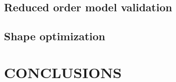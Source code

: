 \documentclass[a4paper]{eccomas_paper-2024}
\begin{document}

\subsection{Reduced order model validation} %
\label{sub:Reduced order model validation}


\subsection{Shape optimization} %
\label{sub:Shape optimization}


\section{CONCLUSIONS} %
\label{sec:conclusions}




\end{document}
